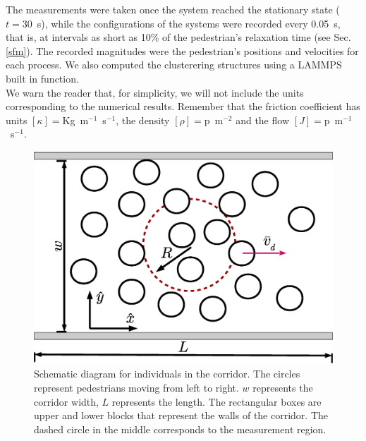 The measurements were taken once the system reached the stationary state ($t=30$~s), while the configurations of the systems were recorded every 0.05~s, that is, at intervals as short as 10\% of the pedestrian’s relaxation time (see Sec. \ref{sfm}). The recorded magnitudes were the pedestrian’s positions and velocities for each process. We also computed the clusterering structures using a LAMMPS built in function.\\
  
We warn the reader that, for simplicity, we will not include the units corresponding to the numerical results. Remember that the friction coefficient has units $\left [ \kappa \right]=$Kg~m$^{-1}$~s$^{-1}$, the density $\left [ \rho \right]=$p~m$^{-2}$  and the flow  $\left [ J \right ]=$p~m$^{-1}$~s$^{-1}$.


\begin{figure}[htbp!]
\includegraphics[width=\columnwidth]
{./plots/corridor.eps}
\caption{\label{corridor} Schematic diagram for individuals in the corridor. 
The circles represent pedestrians moving from left to right. $w$ represents the corridor width, $L$ represents the length. The rectangular boxes are upper and lower blocks that represent the walls of the corridor. The dashed circle in the middle corresponds to the measurement region.}
\end{figure}
